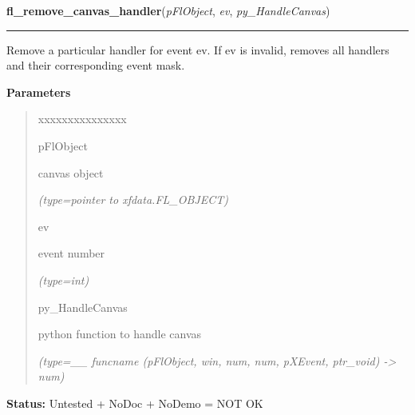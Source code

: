 \hspace{.8\funcindent}\begin{boxedminipage}{\funcwidth}

    \raggedright \textbf{fl\_remove\_canvas\_handler}(\textit{pFlObject}, \textit{ev}, \textit{py\_HandleCanvas})

    \vspace{-1.5ex}

    \rule{\textwidth}{0.5\fboxrule}
\setlength{\parskip}{2ex}
    Remove a particular handler for event ev. If ev is invalid, removes all
    handlers and their corresponding event mask.

\setlength{\parskip}{1ex}
      \textbf{Parameters}
      \vspace{-1ex}

      \begin{quote}
        \begin{Ventry}{xxxxxxxxxxxxxxx}

          \item[pFlObject]

          canvas object

            {\it (type=pointer to xfdata.FL\_OBJECT)}

          \item[ev]

          event number

            {\it (type=int)}

          \item[py\_HandleCanvas]

          python function to handle canvas

            {\it (type=\_\_ funcname (pFlObject, win, num, num, pXEvent, ptr\_void) 
-{\textgreater} num)}

        \end{Ventry}

      \end{quote}

\textbf{Status:} Untested + NoDoc + NoDemo = NOT OK



    \end{boxedminipage}

    \label{xformslib:flcanvas:fl_hide_canvas}

    \vspace{0.5ex}


